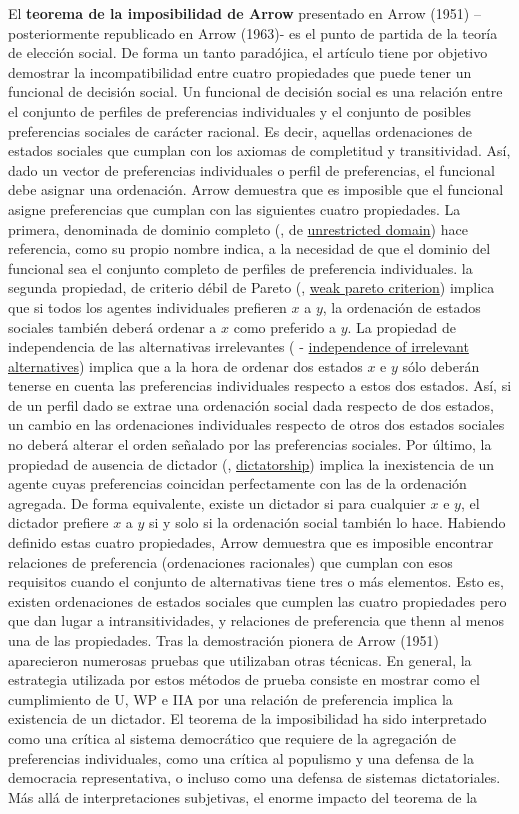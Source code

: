 \documentclass{nuevotema}
\begin{document}
El \textbf{teorema de la imposibilidad de Arrow} presentado en Arrow (1951) --posteriormente republicado en Arrow (1963)- es el punto de partida de la teoría de elección social. De forma un tanto paradójica, el artículo tiene por objetivo demostrar la incompatibilidad entre cuatro propiedades que puede tener un funcional de decisión social. Un funcional de decisión social es una relación entre el conjunto de perfiles de preferencias individuales y el conjunto de posibles preferencias sociales de carácter racional. Es decir, aquellas ordenaciones de estados sociales que cumplan con los axiomas de completitud y transitividad. Así, dado un vector de preferencias individuales o perfil de preferencias, el funcional debe asignar una ordenación. Arrow demuestra que es imposible que el funcional asigne preferencias que cumplan con las siguientes {cuatro propiedades}. La primera, denominada de dominio completo (, de \underline{unrestricted domain}) hace referencia, como su propio nombre indica, a la necesidad de que el dominio del funcional sea el conjunto completo de perfiles de preferencia individuales. la segunda propiedad, de criterio débil de Pareto (, \underline{weak pareto criterion}) implica que si todos los agentes individuales prefieren $x$ a $y$, la ordenación de estados sociales también deberá ordenar a $x$ como preferido a $y$. La propiedad de independencia de las alternativas irrelevantes ( - \underline{independence of irrelevant alternatives}) implica que a la hora de ordenar dos estados $x$ e $y$ sólo deberán tenerse en cuenta las preferencias individuales respecto a estos dos estados. Así, si de un perfil dado se extrae una ordenación social dada respecto de dos estados, un cambio en las ordenaciones individuales respecto de otros dos estados sociales no deberá alterar el orden señalado por las preferencias sociales. Por último, la propiedad de ausencia de dictador (, \underline{dictatorship}) implica la inexistencia de un agente cuyas preferencias coincidan perfectamente con las de la ordenación agregada. De forma equivalente, existe un dictador si para cualquier $x$ e $y$, el dictador prefiere $x$ a $y$ si y solo si la ordenación social también lo hace. Habiendo definido estas cuatro propiedades, Arrow demuestra que es imposible encontrar relaciones de preferencia (ordenaciones racionales) que cumplan con esos requisitos cuando el conjunto de alternativas tiene tres o más elementos. Esto es, existen ordenaciones de estados sociales que cumplen las cuatro propiedades pero que dan lugar a intransitividades, y relaciones de preferencia que thenn al menos una de las propiedades. Tras la demostración pionera de Arrow (1951) aparecieron numerosas pruebas que utilizaban otras técnicas. En general, la estrategia utilizada por estos métodos de prueba consiste en mostrar como el cumplimiento de U, WP e IIA por una relación de preferencia implica la existencia de un dictador. El teorema de la imposibilidad ha sido interpretado como una crítica al sistema democrático que requiere de la agregación de preferencias individuales, como una crítica al populismo y una defensa de la democracia representativa, o incluso como una defensa de sistemas dictatoriales. Más allá de interpretaciones subjetivas, el enorme impacto del teorema de la 
\end{document}
